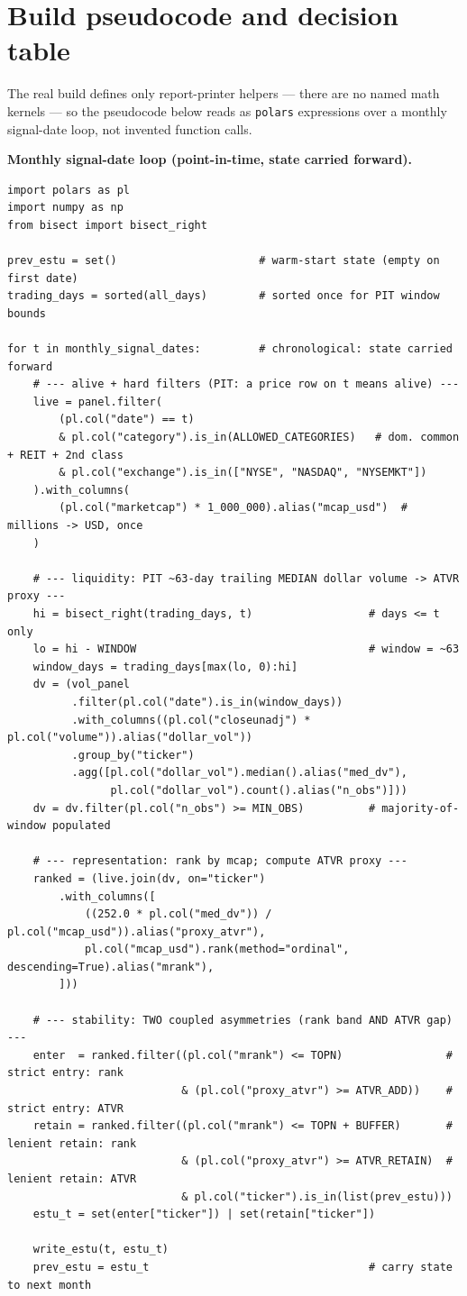 \documentclass[11pt]{article}
\theoremstyle{definition}
\theoremstyle{plain}
\theoremstyle{remark}
\begin{document}
\appendix
\section{Build pseudocode and decision table}\label{app:code}

The real build defines only report-printer helpers --- there are no named math kernels --- so the pseudocode below reads as \texttt{polars} expressions over a monthly signal-date loop, not invented function calls.

\medskip
\noindent\textbf{Monthly signal-date loop (point-in-time, state carried forward).}
{\footnotesize
\begin{verbatim}
import polars as pl
import numpy as np
from bisect import bisect_right

prev_estu = set()                      # warm-start state (empty on first date)
trading_days = sorted(all_days)        # sorted once for PIT window bounds

for t in monthly_signal_dates:         # chronological: state carried forward
    # --- alive + hard filters (PIT: a price row on t means alive) ---
    live = panel.filter(
        (pl.col("date") == t)
        & pl.col("category").is_in(ALLOWED_CATEGORIES)   # dom. common + REIT + 2nd class
        & pl.col("exchange").is_in(["NYSE", "NASDAQ", "NYSEMKT"])
    ).with_columns(
        (pl.col("marketcap") * 1_000_000).alias("mcap_usd")  # millions -> USD, once
    )

    # --- liquidity: PIT ~63-day trailing MEDIAN dollar volume -> ATVR proxy ---
    hi = bisect_right(trading_days, t)                  # days <= t only
    lo = hi - WINDOW                                    # window = ~63
    window_days = trading_days[max(lo, 0):hi]
    dv = (vol_panel
          .filter(pl.col("date").is_in(window_days))
          .with_columns((pl.col("closeunadj") * pl.col("volume")).alias("dollar_vol"))
          .group_by("ticker")
          .agg([pl.col("dollar_vol").median().alias("med_dv"),
                pl.col("dollar_vol").count().alias("n_obs")]))
    dv = dv.filter(pl.col("n_obs") >= MIN_OBS)          # majority-of-window populated

    # --- representation: rank by mcap; compute ATVR proxy ---
    ranked = (live.join(dv, on="ticker")
        .with_columns([
            ((252.0 * pl.col("med_dv")) / pl.col("mcap_usd")).alias("proxy_atvr"),
            pl.col("mcap_usd").rank(method="ordinal", descending=True).alias("mrank"),
        ]))

    # --- stability: TWO coupled asymmetries (rank band AND ATVR gap) ---
    enter  = ranked.filter((pl.col("mrank") <= TOPN)                # strict entry: rank
                           & (pl.col("proxy_atvr") >= ATVR_ADD))    # strict entry: ATVR
    retain = ranked.filter((pl.col("mrank") <= TOPN + BUFFER)       # lenient retain: rank
                           & (pl.col("proxy_atvr") >= ATVR_RETAIN)  # lenient retain: ATVR
                           & pl.col("ticker").is_in(list(prev_estu)))
    estu_t = set(enter["ticker"]) | set(retain["ticker"])

    write_estu(t, estu_t)
    prev_estu = estu_t                                  # carry state to next month
\end{verbatim}
}
\end{document}
